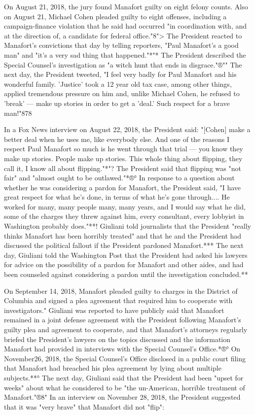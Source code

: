 On August 21, 2018, the jury found Manafort guilty on eight felony counts.
Also on August 21, Michael Cohen pleaded guilty to eight offenses, including a campaign-finance violation that he said had occurred "in coordination with, and at the direction of, a candidate for federal office."8">
The President reacted to Manafort's convictions that day by telling reporters, "Paul Manafort's a good man" and "it's a very sad thing that happened."*"*
The President described the Special Counsel's investigation as "a witch hunt that ends in disgrace."®""
The next day, the President tweeted, "I feel very badly for Paul Manafort and his wonderful family.
'Justice' took a 12 year old tax case, among other things, applied tremendous pressure on him and, unlike Michael Cohen, he refused to 'break' — make up stories in order to get a 'deal.'
Such respect for a brave man!"878

In a Fox News interview on August 22, 2018, the President said: "[Cohen] make a better deal when he uses me, like everybody else.
And one of the reasons I respect Paul Manafort so much is he went through that trial — you know they make up stories.
People make up stories.
This whole thing about flipping, they call it, I know all about flipping."*"?
The President said that flipping was "not fair" and "almost ought to be outlawed."*®°
In response to a question about whether he was considering a pardon for Manafort, the President said, "I have great respect for what he's done, in terms of what he's gone through....
He worked for many, many people many, many years, and I would say what he did, some of the charges they threw against him, every consultant, every lobbyist in Washington probably does."**!
Giuliani told journalists that the President "really thinks Manafort has been horribly treated" and that he and the President had discussed the political fallout if the President pardoned Manafort.***
The next day, Giuliani told the Washington Post that the President had asked his lawyers for advice on the possibility of a pardon for Manafort and other aides, and had been counseled against considering a pardon until the investigation concluded.**

On September 14, 2018, Manafort pleaded guilty to charges in the District of Columbia and signed a plea agreement that required him to cooperate with investigators."
Giuliani was reported to have publicly said that Manafort remained in a joint defense agreement with the President following Manafort's guilty plea and agreement to cooperate, and that Manafort's attorneys regularly briefed the President's lawyers on the topics discussed and the information Manafort had provided in interviews with the Special Counsel's Office.*®°
On November26, 2018, the Special Counsel's Office disclosed in a public court filing that Manafort had breached his plea agreement by lying about multiple subjects.**°
The next day, Giuliani said that the President had been "upset for weeks" about what he considered to be "the un-American, horrible treatment of Manafort."®8"
In an interview on November 28, 2018, the President suggested that it was "very brave" that Manafort did not "flip":

